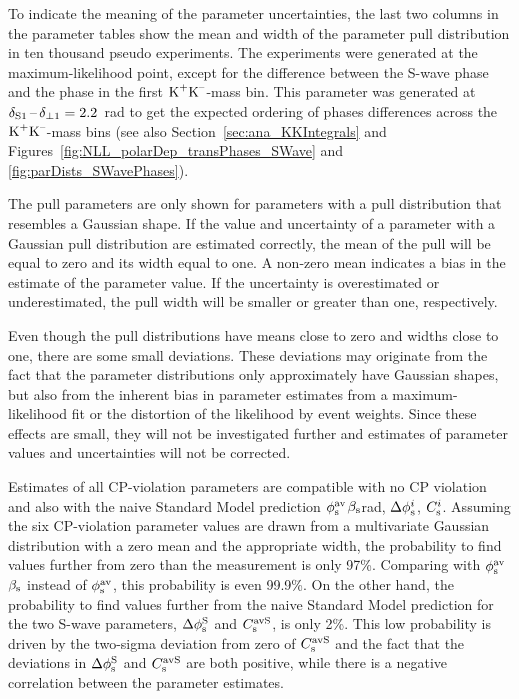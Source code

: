 To indicate the meaning of the parameter uncertainties, the last two columns in the parameter tables show the mean and width of the
parameter pull distribution in ten thousand pseudo experiments. The experiments were generated at the maximum-likelihood point, except for
the difference between the S-wave phase and the \BstoJpsiphi{} phase in the first $\KK$-mass bin. This parameter was generated at
$\delSperp[\text{1}]=2.2$~rad to get the expected ordering of phases differences across the $\KK$-mass bins (see also
Section~\ref{sec:ana_KKIntegrals} and Figures~\ref{fig:NLL_polarDep_transPhases_SWave} and \ref{fig:parDists_SWavePhases}).

The pull parameters are only shown for parameters with a pull distribution that resembles a Gaussian shape. If the value and uncertainty of
a parameter with a Gaussian pull distribution are estimated correctly, the mean of the pull will be equal to zero and its width equal to
one. A non-zero mean indicates a bias in the estimate of the parameter value. If the uncertainty is overestimated or underestimated, the
pull width will be smaller or greater than one, respectively.

Even though the pull distributions have means close to zero and widths close to one, there are some small deviations. These deviations may
originate from the fact that the parameter distributions only approximately have Gaussian shapes, but also from the inherent bias in
parameter estimates from a maximum-likelihood fit or the distortion of the likelihood by event weights. Since these effects are small, they
will not be investigated further and estimates of parameter values and uncertainties will not be corrected.

Estimates of all CP-violation parameters are compatible with no CP violation and also with the naive Standard Model prediction
$\phisav$\texteq{}$\bs$\mbox{\textapprox{}\unitsp{}rad}, $\Delphisi$, $\Csi$. Assuming the six \BstoJpsiphi{}
CP-violation parameter values are drawn from a multivariate Gaussian distribution with a zero mean and the appropriate width, the
probability to find values further from zero than the measurement is only 97\%. Comparing with $\phisav$\texteq{}$\bs$ instead of
$\phisav$, this probability is even 99.9\%. On the other hand, the probability to find values further from the naive Standard Model
prediction for the two S-wave parameters, $\DelphisS$ and $\CsavS$, is only 2\%. This low probability is driven by the two-sigma deviation
from zero of $\CsavS$ and the fact that the deviations in $\DelphisS$ and $\CsavS$ are both positive, while there is a negative correlation
between the parameter estimates.


